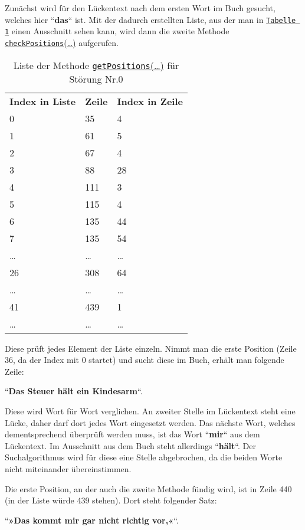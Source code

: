 \documentclass[a4paper, 10pt, ngerman]{scrartcl}
\begin{document}
Zunächst wird für den Lückentext nach dem ersten Wort im Buch gesucht,
welches hier ``\textbf{das}`` ist.
Mit der dadurch erstellten Liste,
aus der man in \hyperref[tab:listeStoerung0]{\texttt{Tabelle 1}} einen Ausschnitt sehen kann,
wird dann die zweite Methode \hyperref[sec:checkPositions()]{\texttt{checkPositions}(\ldots)} aufgerufen.
\begin{table}\label{tab:listeStoerung0}
\centering
\begin{tabular}{lll}
	\textbf{Index in Liste} & \textbf{Zeile} & \textbf{Index in Zeile}\\
	0 & 35 & 4 \\
	1 & 61 & 5 \\
	2 & 67 & 4 \\
	3 & 88 & 28 \\
	4 & 111 & 3 \\
	5 & 115 & 4 \\
	6 & 135 & 44 \\
	7 & 135 & 54 \\
	\ldots & \ldots & \ldots \\
	26 & 308 & 64 \\
	\ldots & \ldots & \ldots \\
	41 & 439 & 1 \\
	\ldots & \ldots & \ldots \\
\end{tabular}
\caption{Liste der Methode \hyperref[sec:getPositions()]{\texttt{getPositions}(\ldots)} für Störung Nr.0}
\end{table}
Diese prüft jedes Element der Liste einzeln.
Nimmt man die erste Position
(Zeile 36,
da der Index mit 0 startet)
und sucht diese im Buch,
erhält man folgende Zeile:

``\textbf{Das Steuer hält ein Kindesarm}``.

Diese wird Wort für Wort verglichen.
An zweiter Stelle im Lückentext steht eine Lücke,
daher darf dort jedes Wort eingesetzt werden.
Das nächste Wort,
welches dementsprechend überprüft werden muss,
ist das Wort ``\textbf{mir}`` aus dem Lückentext.
Im Ausschnitt aus dem Buch steht allerdings ``\textbf{hält}``.
Der Suchalgorithmus wird für diese eine Stelle abgebrochen,
da die beiden Worte nicht miteinander übereinstimmen.

Die erste Position,
an der auch die zweite Methode fündig wird,
ist in Zeile 440
(in der Liste würde 439 stehen).
Dort steht folgender Satz:

``\textbf{»Das kommt mir gar nicht richtig vor,«}``.
\end{document}
